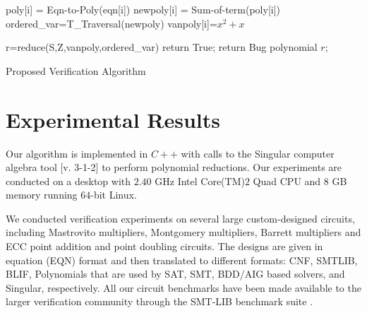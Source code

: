 \begin{algorithm}[hbt]
\SetAlgoNoLine


  	{
  		poly[i] = Eqn-to-Poly(eqn[i])\;
  		newpoly[i] = Sum-of-term(poly[i])\;
	}
ordered\_var=T\_Traversal(newpoly)\;
	{
    	vanpoly[i]=$x^2+x$\;
	}    

r=reduce(S,Z,vanpoly,ordered\_var)\;
   {
   	 return True;
   }
   {
   	 return Bug polynomial $r$; %
   }	 

\caption{Proposed Verification Algorithm}\label{alg:overall}
\end{algorithm}


\section{Experimental Results}
Our algorithm is implemented in $C++$ with calls to the {\sc Singular}
computer algebra tool [v. 3-1-2] \cite{DGPS} to perform polynomial
reductions. Our experiments are conducted on a desktop with $2.40$ GHz
Intel Core(TM)$2$ Quad CPU and  $8$ GB memory running $64$-bit Linux. 


We conducted verification experiments on several large custom-designed
circuits, including Mastrovito multipliers, Montgomery multipliers,
Barrett multipliers and ECC point addition and point doubling
circuits. The designs are given in equation (EQN) format and then
translated to different formats: CNF, SMTLIB, BLIF, Polynomials that
are used  by SAT, SMT, BDD/AIG based solvers, and Singular,
respectively. All our circuit benchmarks have been made available to
the larger verification community through the SMT-LIB benchmark suite
\cite{satsmtbench:2011}.  

